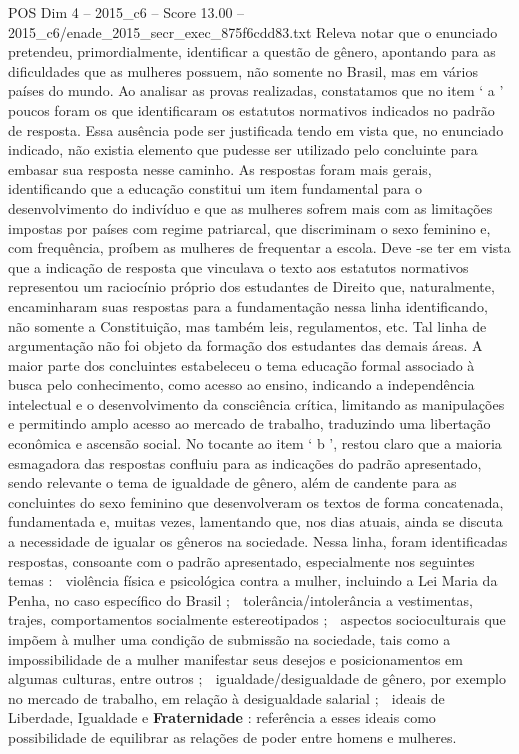 \begin{textsample}{POS Dim 4 – 2015\_c6 – Score 13.00 – 2015\_c6/enade\_2015\_secr\_exec\_875f6cdd83.txt}
Releva notar que o enunciado pretendeu, primordialmente, identificar a questão de gênero, apontando para as dificuldades que as mulheres possuem, não somente no Brasil, mas em vários países do mundo.
Ao analisar as provas realizadas, constatamos que no item ‘ a ’ poucos foram os que identificaram os estatutos normativos indicados no padrão de resposta.
Essa ausência pode ser justificada tendo em vista que, no enunciado indicado, não existia elemento que pudesse ser utilizado pelo concluinte para embasar sua resposta nesse caminho.
As respostas foram mais gerais, identificando que a educação constitui um item fundamental para o desenvolvimento do indivíduo e que as mulheres sofrem mais com as limitações impostas por países com regime patriarcal, que discriminam o sexo feminino e, com frequência, proíbem as mulheres de frequentar a escola.
Deve -se ter em vista que a indicação de resposta que vinculava o texto aos estatutos normativos representou um raciocínio próprio dos estudantes de Direito que, naturalmente, encaminharam suas respostas para a fundamentação nessa linha identificando, não somente a Constituição, mas também leis, regulamentos, etc.
Tal linha de argumentação não foi objeto da formação dos estudantes das demais áreas.
A maior parte dos concluintes estabeleceu o tema educação formal associado à busca pelo conhecimento, como acesso ao ensino, indicando a independência intelectual e o desenvolvimento da consciência crítica, limitando as manipulações e permitindo amplo acesso ao mercado de trabalho, traduzindo uma libertação econômica e ascensão social.
No tocante ao item ‘ b ’, restou claro que a maioria esmagadora das respostas confluiu para as indicações do padrão apresentado, sendo relevante o tema de igualdade de gênero, além de candente para as concluintes do sexo feminino que desenvolveram os textos de forma concatenada, fundamentada e, muitas vezes, lamentando que, nos dias atuais, ainda se discuta a necessidade de igualar os gêneros na sociedade.
Nessa linha, foram identificadas respostas, consoante com o padrão apresentado, especialmente nos seguintes temas :  violência física e psicológica contra a mulher, incluindo a Lei Maria da Penha, no caso específico do Brasil ;  tolerância/intolerância a vestimentas, trajes, comportamentos socialmente estereotipados ;  aspectos socioculturais que impõem à mulher uma condição de submissão na sociedade, tais como a impossibilidade de a mulher manifestar seus desejos e posicionamentos em algumas culturas, entre outros ;  igualdade/desigualdade de gênero, por exemplo no mercado de trabalho, em relação à desigualdade salarial ;  ideais de Liberdade, Igualdade e \textbf{Fraternidade} : referência a esses ideais como possibilidade de equilibrar as relações de poder entre homens e mulheres.

\end{textsample}

